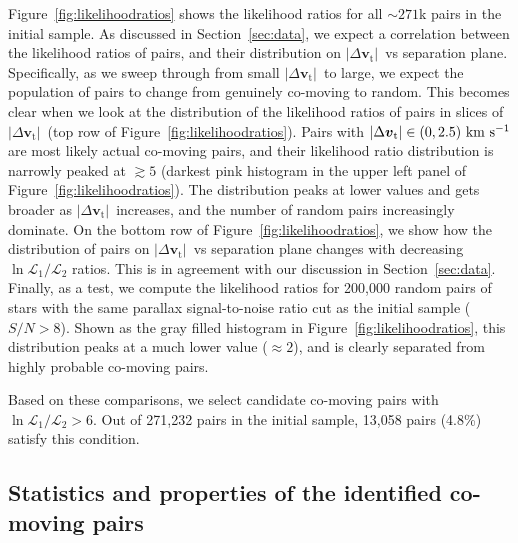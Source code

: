 \documentclass[manuscript, letterpaper]{aastex6}
\newcommand{\sectionname}{Section}
\newcommand{\bs}[1]{\boldsymbol{#1}}
\renewcommand{\vec}[1]{\bs{#1}}
\newcommand{\kms}{\ensuremath{\rm km~s^{-1}}}
\newcommand{\absdvtan}{\ensuremath{|\Delta\vec v_\mathrm{t}|}}
\begin{document}
Figure~\ref{fig:likelihoodratios} shows the likelihood ratios for all
$\sim 271$k pairs in the initial sample.
As discussed in \sectionname~\ref{sec:data}, we expect a correlation between the likelihood
ratios of pairs, and their distribution on \absdvtan\ vs separation plane.
Specifically, as we sweep through from small \absdvtan\ to large, we expect
the population of pairs to change from genuinely co-moving to random.
This becomes clear when we look at the distribution of the likelihood ratios of pairs
in slices of \absdvtan\ (top row of Figure~\ref{fig:likelihoodratios}).
Pairs with $\absdvtan \in (0,2.5)~\kms$ are most likely actual co-moving pairs, and
their likelihood ratio distribution is narrowly peaked at $\gtrsim 5$
(darkest pink histogram in the upper left panel of Figure~\ref{fig:likelihoodratios}).
The distribution peaks at lower values and gets broader as \absdvtan\ increases,
and the number of random pairs increasingly dominate.
On the bottom row of Figure~\ref{fig:likelihoodratios}, we show
how the distribution of pairs on \absdvtan\ vs separation plane changes
with decreasing $\ln \mathcal{L}_1 /\mathcal{L}_2$ ratios.
This is in agreement with our discussion in \sectionname~\ref{sec:data}.
Finally, as a test,
we compute the likelihood ratios for 200,000 random pairs of stars with the same
parallax signal-to-noise ratio cut as the initial sample ($S/N > 8$).
Shown as the gray filled histogram in Figure~\ref{fig:likelihoodratios},
this distribution peaks at a much lower value ($\approx 2$),
and is clearly separated from highly probable co-moving pairs.

Based on these comparisons, we select candidate co-moving pairs with
$\ln \mathcal{L}_1 /\mathcal{L}_2 > 6$.
Out of 271,232 pairs in the initial sample, 13,058 pairs (4.8\%)
satisfy this condition.

\subsection{Statistics and properties of the identified co-moving pairs}
\end{document}
